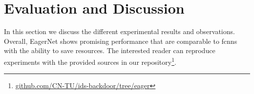 \documentclass[conference]{IEEEtran}
\begin{document}
%



\section{Evaluation and Discussion}
\label{evaluation_and_discussion}
In this section we discuss the different experimental results and observations. Overall, EagerNet shows promising performance that are comparable to \glspl{fcnn} with the ability to save resources. The interested reader can reproduce experiments with the provided sources in our repository\footnote{\url{github.com/CN-TU/ids-backdoor/tree/eager}}.
\end{document}
